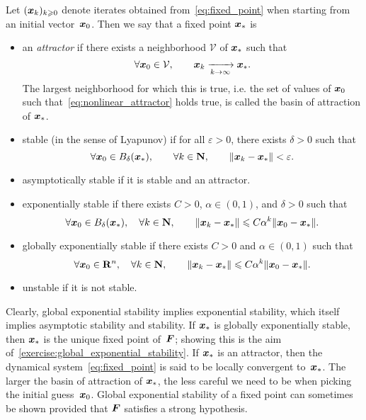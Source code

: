 \begin{definition}
    Let $(\mathbf{\boldsymbol{x}}_k)_{k\geqslant0}$ denote iterates obtained from~\eqref{eq:fixed_point} when starting from an initial vector~$\mathbf{\boldsymbol{x}}_0$.
    Then we say that a fixed point $\mathbf{\boldsymbol{x}}_*$ is
    \begin{itemize}
        \item
            an \emph{attractor} if there exists a neighborhood $\mathcal V$ of $\mathbf{\boldsymbol{x}}_*$ such that
            \begin{equation}
                \label{eq:nonlinear_attractor}
                \forall \mathbf{\boldsymbol{x}}_0 \in \mathcal V, \qquad
                \mathbf{\boldsymbol{x}}_k \xrightarrow[k \to \infty]{} \mathbf{\boldsymbol{x}}_*.
            \end{equation}
            The largest neighborhood for which this is true,
            i.e. the set of values of $\mathbf{\boldsymbol{x}}_0$ such that~\eqref{eq:nonlinear_attractor} holds true,
            is called the basin of attraction of $\mathbf{\boldsymbol{x}}_*$.

        \item
            stable (in the sense of Lyapunov) if for all $\varepsilon > 0$,
            there exists $\delta > 0$ such that
            \[
                \forall \mathbf{\boldsymbol{x}}_0 \in B_{\delta}(\mathbf{\boldsymbol{x}}_*), \qquad
                \forall k \in \mathbf N, \qquad
                \lVert\mathbf{\boldsymbol{x}}_k - \mathbf{\boldsymbol{x}}_*\rVert < \varepsilon.
            \]

        \item
            asymptotically stable if it is stable and an attractor.

        \item
            exponentially stable if there exists $C > 0$, $\alpha \in (0, 1)$, and $\delta > 0$ such that
            \[
                \forall \mathbf{\boldsymbol{x}}_0 \in B_{\delta}(\mathbf{\boldsymbol{x}}_*),
                \quad \forall k \in \mathbf N, \qquad
                \lVert\mathbf{\boldsymbol{x}}_k - \mathbf{\boldsymbol{x}}_*\rVert \leqslant C \alpha^k \lVert\mathbf{\boldsymbol{x}}_0 - \mathbf{\boldsymbol{x}}_*\rVert.
            \]

        \item
            globally exponentially stable if there exists $C > 0$ and $\alpha \in (0, 1)$ such that
            \[
                \forall \mathbf{\boldsymbol{x}}_0 \in \mathbf R^n,
                \quad \forall k \in \mathbf N, \qquad
                \lVert\mathbf{\boldsymbol{x}}_k - \mathbf{\boldsymbol{x}}_*\rVert \leqslant C \alpha^k \lVert\mathbf{\boldsymbol{x}}_0 - \mathbf{\boldsymbol{x}}_*\rVert.
            \]
        \item
            unstable if it is not stable.
    \end{itemize}
\end{definition}
Clearly, global exponential stability implies exponential stability,
which itself implies asymptotic stability and stability.
If $\mathbf{\boldsymbol{x}}_*$ is globally exponentially stable,
then $\mathbf{\boldsymbol{x}}_*$ is the unique fixed point of~$\mathbf{\boldsymbol{F}}$;
showing this is the aim of~\cref{exercise:global_exponential_stability}.
If $\mathbf{\boldsymbol{x}}_*$ is an attractor,
then the dynamical system~\eqref{eq:fixed_point} is said to be locally convergent to~$\mathbf{\boldsymbol{x}}_*$.
The larger the basin of attraction of $\mathbf{\boldsymbol{x}}_*$,
the less careful we need to be when picking the initial guess~$\mathbf{\boldsymbol{x}}_0$.
Global exponential stability of a fixed point can sometimes be shown
provided that $\mathbf{\boldsymbol{F}}$ satisfies a strong hypothesis.

